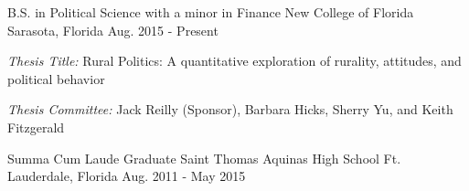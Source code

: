 

\begin{cventries}

  \cventry
    {B.S. in Political Science with a minor in Finance} %
    {New College of Florida} %
    {Sarasota, Florida} %
    {Aug. 2015 - Present} %
    {
    \begin{cvitems}
      \item \emph{Thesis Title:} Rural Politics: A quantitative exploration of rurality, attitudes, and political behavior
      \item \emph{Thesis Committee:} Jack Reilly (Sponsor), Barbara Hicks, Sherry Yu, and Keith Fitzgerald 
    \end{cvitems}
  }

  \cventry
    {Summa Cum Laude Graduate} %
    {Saint Thomas Aquinas High School} %
    {Ft. Lauderdale, Florida} %
    {Aug. 2011 - May 2015} %
    {}


\vspace{-.1cm}


\end{cventries}
